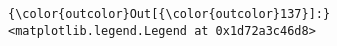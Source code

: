 \documentclass[11pt]{article}
\begin{document}
            \begin{Verbatim}[commandchars=\\\{\}]
{\color{outcolor}Out[{\color{outcolor}137}]:} <matplotlib.legend.Legend at 0x1d72a3c46d8>
\end{Verbatim}
        
    \begin{center}
    \end{center}
    { \hspace*{\fill} \\}
    

    
    
    
    
\end{document}
